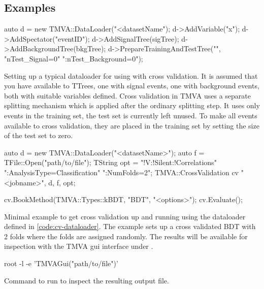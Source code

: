 \subsection{Examples}

\begin{codeexample}
\begin{tmvacode}
auto d = new TMVA::DataLoader("<datasetName");
d->AddVariable("x");
d->AddSpectator("eventID");
d->AddSignalTree(sigTree);
d->AddBackgroundTree(bkgTree);
d->PrepareTrainingAndTestTree("", "nTest_Signal=0"
                                  ":nTest_Background=0");
\end{tmvacode}
\caption[.]{\codeexampleCaptionSize
Setting up a typical dataloader for using with cross validation. It is assumed that you have available to TTrees, one with signal events, one with background events, both with suitable variables defined.
Cross validation in TMVA uses a separate splitting mechanism which is applied after the ordinary splitting step. It uses only events in the training set, the test set is currently left unused. To make all events available to cross validation, they are placed in the training set by setting the size of the test set to zero.
}
\label{code:cv-dataloader}
\end{codeexample}



\begin{codeexample}
\begin{tmvacode}
auto d = new TMVA::DataLoader("<datasetName>");
auto f = TFile::Open("path/to/file");
TString opt = "!V:!Silent:!Correlations"
              ":AnalysisType=Classification"
              ":NumFolds=2";
TMVA::CrossValidation cv {"<jobname>", d, f, opt};

cv.BookMethod(TMVA::Types::kBDT, "BDT", "<options>");
cv.Evaluate();
\end{tmvacode}
\caption[.]{\codeexampleCaptionSize Minimal example to get cross validation up and running using the dataloader defined in \ref{code:cv-dataloader}. The example sets up a cross validated BDT with 2 folds where the folds are assigned randomly. The results will be available for inspection with the TMVA gui interface under .}
\label{code:cv-minimal}
\end{codeexample}

\begin{codeexample}
\begin{tmvacode}
root -l -e 'TMVAGui("path/to/file")'
\end{tmvacode}
\caption[.]{\codeexampleCaptionSize Command to run to inspect the resulting output file.}
\label{code:cv-gui}
\end{codeexample}

